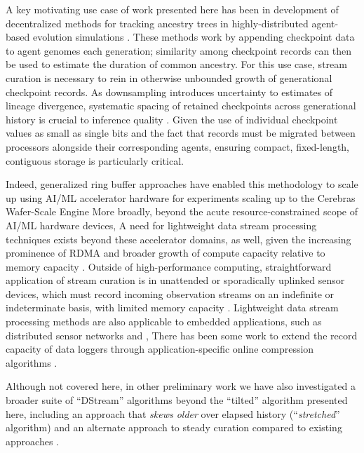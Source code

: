 A key motivating use case of work presented here has been in development of decentralized methods for tracking ancestry trees in highly-distributed agent-based evolution simulations \citep{moreno2022hereditary}.
These methods work by appending checkpoint data to agent genomes each generation;
similarity among checkpoint records can then be used to estimate the duration of common ancestry.
For this use case, stream curation is necessary to rein in otherwise unbounded growth of generational checkpoint records.
As downsampling introduces uncertainty to estimates of lineage divergence, systematic spacing of retained checkpoints across generational history is crucial to inference quality \citet{moreno2024guide}.
Given the use of individual checkpoint values as small as single bits and the fact that records must be migrated between processors alongside their corresponding agents, ensuring compact, fixed-length, contiguous storage is particularly critical.

Indeed, generalized ring buffer approaches have enabled this methodology to scale up using AI/ML accelerator hardware for experiments scaling up to the Cerebras Wafer-Scale Engine \citep{moreno2024trackable}
More broadly, beyond the acute resource-constrained scope of AI/ML hardware devices,
A need for lightweight data stream processing techniques exists beyond these accelerator domains, as well, given the increasing prominence of RDMA \citep{wang2024survey} and broader growth of compute capacity relative to memory capacity \citep{qureshi2014memory}.
Outside of high-performance computing, straightforward application of stream curation is in unattended or sporadically uplinked sensor devices, which must record incoming observation streams on an indefinite or indeterminate basis, with limited memory capacity \citep{jain2022survey}.
Lightweight data stream processing methods are also applicable to embedded applications, such as distributed sensor networks and \citep{elnahrawy2003research},
There has been some work to extend the record capacity of data loggers through application-specific online compression algorithms \citep{hadiatna2016design}.


Although not covered here, in other preliminary work we have also investigated a broader suite of ``DStream'' algorithms beyond the ``tilted'' algorithm presented here, including an approach that \textit{skews older} over elapsed history (``\textit{stretched}'' algorithm) and an alternate approach to steady curation compared to existing approaches \citep{moreno2024structured}.
